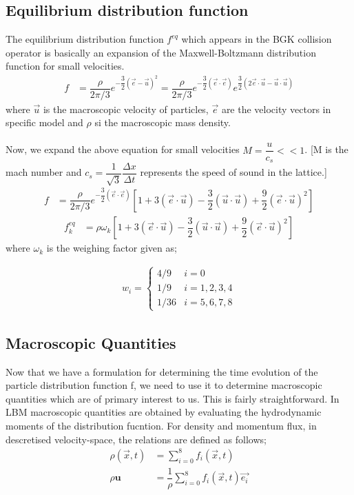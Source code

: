 \documentclass[12pt,a4paper]{report}
\begin{document}
	\subsection{Equilibrium distribution function}
		The equilibrium distribution function $f^{eq}$ which appears in 
		the BGK collision operator is basically an expansion of the 
		Maxwell-Boltzmann distribution function for small velocities.
		\begin{align}
			f &= \dfrac{\rho}{2\pi/3}e^{-\dfrac{3}{2}(\vec{e}-\vec{u})^2} = \dfrac{\rho}{2\pi/3}e^{-\dfrac{3}{2}(\vec{e}\cdot\vec{e})}e^{\dfrac{3}{2}(2\vec{e}\cdot\vec{u} - \vec{u}\cdot\vec{u})}
		\end{align}
		where $\vec{u}$ is the macroscopic velocity of particles, $\vec{e}$ 
		are the velocity vectors in specific model and $\rho$ si the macroscopic 
		mass density.\\
		\\
		Now, we expand the above equation for small velocities $M = \dfrac{u}{c_s} << 1$.
		[M is the mach number and $c_s = \dfrac{1}{\sqrt{3}}\dfrac{\Delta x}{\Delta t}$
		represents the speed of sound in the lattice.] 
		\begin{align}
			f &= \dfrac{\rho}{2\pi/3}e^{-\dfrac{3}{2}(\vec{e}\cdot\vec{e})}\left[1+3\left(\vec{e}\cdot\vec{u}\right) - \dfrac{3}{2}(\vec{u}\cdot\vec{u}) + \dfrac{9}{2}(\vec{e}\cdot\vec{u})^2\right]		
		\end{align}
		\begin{align}
			f^{eq}_k &= \rho\omega_k\left[1+3\left(\vec{e}\cdot\vec{u}\right) - \dfrac{3}{2}(\vec{u}\cdot\vec{u}) + \dfrac{9}{2}(\vec{e}\cdot\vec{u})^2\right]
		\end{align}
		where $\omega_k$ is the weighing factor given as;
	
		\begin{align}
			w_i = 
			\begin{cases}
				4/9  & i = 0\\
				1/9  & i = 1,2,3,4\\
				1/36 & i = 5,6,7,8
			\end{cases}
		\end{align}
	\subsection{Macroscopic Quantities}
	Now that we have a formulation for determining the time evolution of 
	the particle distribution function f, we need to use it to determine
	macroscopic quantities which are of primary interest to us.
	This is fairly straightforward. In LBM macroscopic quantities are 
	obtained by evaluating the hydrodynamic moments of the	distribution fucntion.
	For density and momentum flux, in descretised velocity-space, the 
	relations are defined as follows;
	\begin{align}
		\rho(\vec{x},t) &= \sum_{i=0}^{8} f_{i}(\vec{x},t)\\
		\rho\textbf{u} &= \dfrac{1}{\rho}\sum_{i=0}^{8} f_{i}(\vec{x},t)\vec{e_i}\\		
	\end{align}
\end{document}
